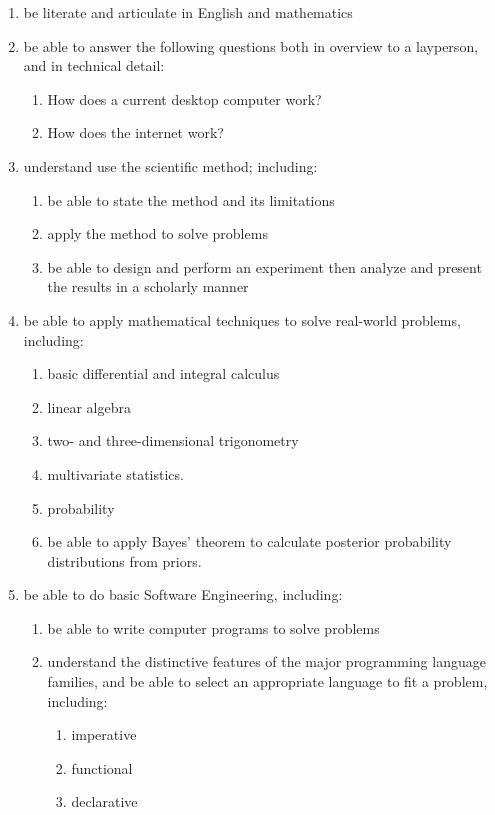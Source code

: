 \documentclass[draft]{article}
\begin{document}
\begin{enumerate}

\item be literate and articulate in English and mathematics

\item be able to answer the following questions both in overview to a layperson, and in technical detail:
  \begin{enumerate}
    \item How does a current desktop computer work?
    \item How does the internet work?
  \end{enumerate}

\item understand use the scientific method; including:
  \begin{enumerate}
    \item be able to state the method and its limitations
    \item apply the method to solve problems
    \item be able to design and perform an experiment then analyze and present the results in a scholarly manner
    \end{enumerate}

\item be able to apply mathematical techniques to solve real-world problems, including:
  \begin{enumerate}
    \item basic differential and integral calculus
    \item linear algebra
    \item two- and three-dimensional trigonometry
    \item multivariate statistics.
    \item probability
    \item be able to apply Bayes' theorem to calculate posterior probability distributions from priors.
  \end{enumerate}

\item be able to do basic Software Engineering, including:
  \begin{enumerate}
    \item be able to write computer programs to solve problems

    \item understand the distinctive features of the major programming
      language families, and be able to select an appropriate language
      to fit a problem, including:
      \begin{enumerate}
        \item imperative
        \item functional
        \item declarative
      \end{enumerate}


\end{enumerate}
\end{enumerate}
\end{document}
